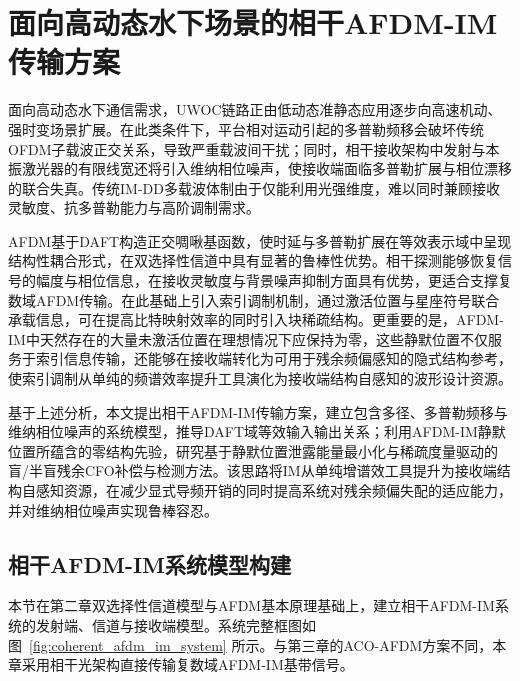 \chapter{面向高动态水下场景的相干AFDM-IM传输方案}
\label{chap:coherent_afdm_im}

面向高动态水下通信需求，UWOC链路正由低动态准静态应用逐步向高速机动、强时变场景扩展\cite{hoeherUnderwaterOpticalWireless2021, MianXiangUUVJiQunYingYongDeShuiXiaWuXianGuangTongXinGuanJianJiShu2025}。在此类条件下，平台相对运动引起的多普勒频移会破坏传统OFDM子载波正交关系，导致严重载波间干扰\cite{zhuDopplerResistantOrthogonalChirp2022, fernandesDigitallyMitigatingDoppler2023}；同时，相干接收架构中发射与本振激光器的有限线宽还将引入维纳相位噪声\cite{tangUnderwaterCoherentOptical2021, huPerformanceCoherentOptical2025}，使接收端面临多普勒扩展与相位漂移的联合失真。传统IM-DD多载波体制由于仅能利用光强维度，难以同时兼顾接收灵敏度、抗多普勒能力与高阶调制需求\cite{liuMultiDegreeofFreedomUnderwaterOptical2022}。

AFDM基于DAFT构造正交啁啾基函数，使时延与多普勒扩展在等效表示域中呈现结构性耦合形式，在双选择性信道中具有显著的鲁棒性优势\cite{bemaniAFDMFullDiversity2021, taoAffineFrequencyDivision2025}。相干探测能够恢复信号的幅度与相位信息，在接收灵敏度与背景噪声抑制方面具有优势，更适合支撑复数域AFDM传输\cite{guiomarCoherentFreeSpaceOptical2022, huPerformanceCoherentOptical2025}。在此基础上引入索引调制机制，通过激活位置与星座符号联合承载信息，可在提高比特映射效率的同时引入块稀疏结构\cite{basarOrthogonalFrequencyDivision2013, taoAffineFrequencyDivision2025}。更重要的是，AFDM-IM中天然存在的大量未激活位置在理想情况下应保持为零，这些静默位置不仅服务于索引信息传输，还能够在接收端转化为可用于残余频偏感知的隐式结构参考，使索引调制从单纯的频谱效率提升工具演化为接收端结构自感知的波形设计资源。

基于上述分析，本文提出相干AFDM-IM传输方案，建立包含多径、多普勒频移与维纳相位噪声的系统模型，推导DAFT域等效输入输出关系；利用AFDM-IM静默位置所蕴含的零结构先验，研究基于静默位置泄露能量最小化与稀疏度量驱动的盲/半盲残余CFO补偿与检测方法。该思路将IM从单纯增谱效工具提升为接收端结构自感知资源，在减少显式导频开销的同时提高系统对残余频偏失配的适应能力，并对维纳相位噪声实现鲁棒容忍。

\section{相干AFDM-IM系统模型构建}
\label{sec:coherent_afdm_im_model}

本节在第二章双选择性信道模型与AFDM基本原理基础上，建立相干AFDM-IM系统的发射端、信道与接收端模型。系统完整框图如图~\ref{fig:coherent_afdm_im_system} 所示。与第三章的ACO-AFDM方案不同，本章采用相干光架构直接传输复数域AFDM-IM基带信号。


